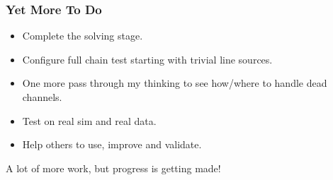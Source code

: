 \documentclass[xcolor=dvipsnames]{beamer}
\begin{document}
\begin{frame}
  \frametitle{Yet More To Do}
  \begin{itemize}
  \item Complete the solving stage.
  \item Configure full chain test starting with trivial line sources.
  \item One more pass through my thinking to see how/where to handle dead channels.
  \item Test on real sim and real data.
  \item Help others to use, improve and validate.
  \end{itemize}

  A lot of more work, but progress is getting made!
\end{frame}
\end{document}
